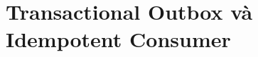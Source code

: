 \documentclass[../DoAn.tex]{subfiles}
\begin{document}



\section{Transactional Outbox và Idempotent Consumer}
\label{section:2.4}
\end{document}
